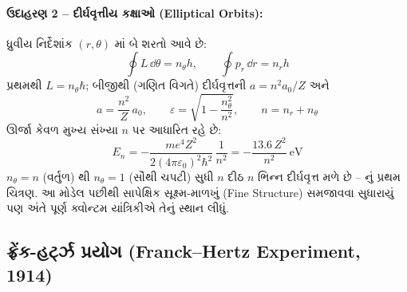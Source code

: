\paragraph{ઉદાહરણ 2 -- દીર્ઘવૃત્તીય કક્ષાઓ (Elliptical Orbits):} ધ્રુવીય નિર્દેશાંક $(r,\theta)$ માં
બે શરતો આવે છે:
\begin{equation}
  \oint L\,\dd\theta=n_\theta h,\qquad \oint p_r\,\dd r=n_r h
\end{equation}
પ્રથમથી $L=n_\theta\hbar$; બીજીથી (ગણિત વિગતે) દીર્ઘવૃત્તની 
$a=n^{2}a_0/Z$ અને 
\begin{equation}
  a=\frac{n^{2}}{Z}\,a_0,\qquad
  \varepsilon=\sqrt{1-\frac{n_\theta^{2}}{n^{2}}},\qquad n=n_r+n_\theta
\end{equation}
ઊર્જા કેવળ મુખ્ય સંખ્યા $n$ પર આધારિત રહે છે:
\begin{equation}
  E_n=-\frac{me^{4}Z^{2}}{2(4\pi\varepsilon_0)^{2}\hbar^{2}}\,\frac{1}{n^{2}}
     =-\frac{13.6\,Z^{2}}{n^{2}}\ \mathrm{eV}
\end{equation}
$n_\theta=n$ (વર્તુળ) થી $n_\theta=1$ (સૌથી ચપટી) સુધી $n$ દીઠ $n$ ભિન્ન દીર્ઘવૃત્ત મળે છે --
 નું પ્રથમ ચિત્રણ. આ મોડેલ પછીથી સાપેક્ષિક
સૂક્ષ્મ-માળખું (Fine Structure) સમજાવવા સુધારાયું પણ અંતે પૂર્ણ ક્વોન્ટમ યાંત્રિકીએ તેનું
સ્થાન લીધું.

\subsection{ફ્રેંક-હર્ટ્ઝ પ્રયોગ (Franck--Hertz Experiment, 1914)}

